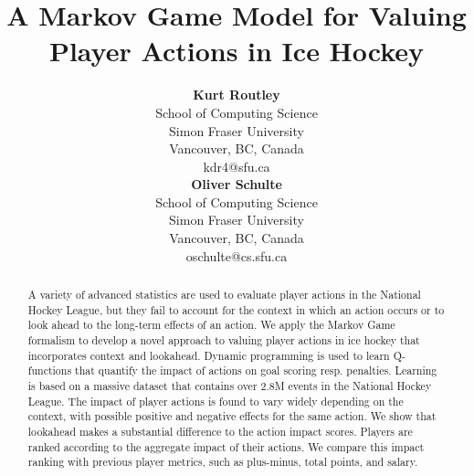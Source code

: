 \documentclass[]{article}
\title{A Markov Game Model for Valuing Player Actions in Ice Hockey}
\author{ {\bf Kurt Routley}\\School of Computing Science\\Simon Fraser University\\Vancouver, BC, Canada\\kdr4@sfu.ca\\
\And
{\bf Oliver Schulte}\\School of Computing Science\\Simon Fraser University\\Vancouver, BC, Canada\\oschulte@cs.sfu.ca}
\begin{document}
\maketitle

\begin{abstract}
A variety of advanced statistics are used to evaluate player actions in the National Hockey League, but they fail to account for the context in which an action occurs or to look ahead to the long-term effects of an action. We apply the Markov Game formalism to develop a novel approach to valuing player actions in ice hockey that incorporates context and lookahead. Dynamic programming is used to learn Q-functions that quantify the impact of actions on goal scoring resp. penalties. Learning is based on a massive dataset that contains over 2.8M events in the National Hockey League.
The impact of player actions is found to vary widely depending on the context, with possible positive and negative effects for the same action. We show that lookahead makes a substantial difference to the action impact scores.
Players are ranked according to the aggregate impact of their actions. We compare this impact ranking with previous player metrics, such as plus-minus, total points, and salary.
\end{abstract}


\end{document}
